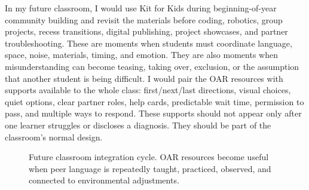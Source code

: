 {}

In my future classroom, I would use Kit for Kids during beginning-of-year community building and revisit the materials before coding, robotics, group projects, recess transitions, digital publishing, project showcases, and partner troubleshooting. These are moments when students must coordinate language, space, noise, materials, timing, and emotion. They are also moments when misunderstanding can become teasing, taking over, exclusion, or the assumption that another student is being difficult. I would pair the OAR resources with supports available to the whole class: first/next/last directions, visual choices, quiet options, clear partner roles, help cards, predictable wait time, permission to pass, and multiple ways to respond. These supports should not appear only after one learner struggles or discloses a diagnosis. They should be part of the classroom's normal design.



\begin{figure}[htbp]
\centering
{}
\caption{Future classroom integration cycle. OAR resources become useful when peer language is repeatedly taught, practiced, observed, and connected to environmental adjustments.}
\label{fig:future-cycle}
\end{figure}


